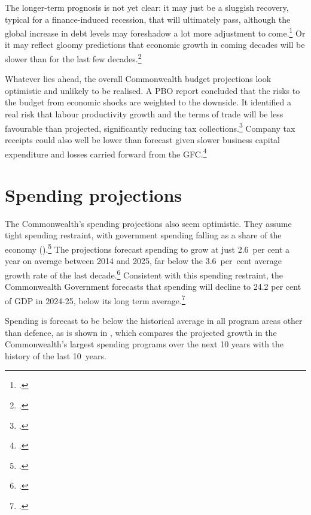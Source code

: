 \documentclass[twoside,english]{Dianab5ona4portrait}
\begin{document}
The longer-term prognosis is not yet clear:  it may just be a sluggish recovery, typical for a finance-induced recession, that will ultimately pass,  although the global increase in debt levels may foreshadow a lot more adjustment to come.\footcites{BailyBosworth2013}{RoxburghLundWimmerEtAl2011} Or it may reflect gloomy predictions that economic growth in coming decades will be slower than for the last few decades.\footcite[][footnote~23]{RoxburghLundWimmerEtAl2011} 

Whatever lies ahead, the overall Commonwealth budget projections look optimistic and unlikely to be realised. A PBO report concluded that the risks to the budget from economic shocks are weighted to the downside. It identified a real risk that labour productivity growth and the terms of trade will be less favourable than projected, significantly reducing tax collections.\footcite{PBO2014TrendsAustralianGovtReceipts1982to2013}  Company tax receipts could also well be lower than forecast given slower business capital expenditure  and losses carried forward from the GFC.\footcite[][38--44]{RBA2015a}

\section{Spending projections}
The Commonwealth’s spending projections also seem optimistic. They assume tight spending restraint, with government spending falling as a share of the economy ().\footcite[][5--11]{Treasury2015BudgetPapers201516}  The projections forecast spending to grow at just 2.6~per cent a year on average between 2014 and 2025, far below the 3.6~per~cent average growth rate of the last decade.\footcite[][5]{PBO2015}  Consistent with this spending restraint, the Commonwealth Government forecasts that spending will decline to 24.2 per cent of GDP in 2024-25, below its long term average.\footcite[][3--9]{Treasury2015BudgetPapers201516}  

Spending is forecast to be below the historical average in all program areas other than defence, as is shown in , which compares the projected growth in the Commonwealth’s largest spending programs over the next 10 years with the history of the last 10~years. 
\end{document}
